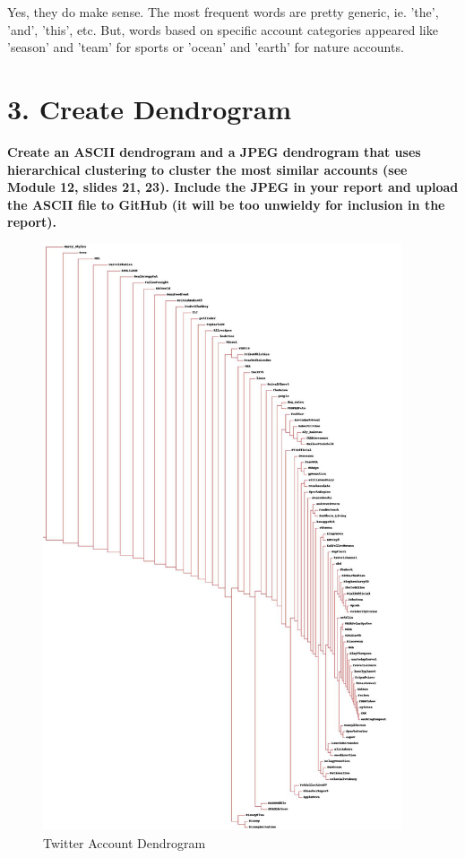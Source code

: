 \documentclass[12pt]{article}
\begin{document}
Yes, they do make sense. The most frequent words are pretty generic, ie. 'the', 'and', 'this', etc. But, words based on specific account categories appeared like 'season' and 'team' for sports or 'ocean' and 'earth' for nature accounts. 

\section*{3. Create Dendrogram}
\noindent \textbf{Create an ASCII dendrogram and a JPEG dendrogram that uses hierarchical clustering to cluster the most similar accounts (see Module 12, slides 21, 23). Include the JPEG in your report and upload the ASCII file to GitHub (it will be too unwieldy for inclusion in the report).}

\clearpage

\begin{figure}[h]
    \centering
    \includegraphics[width=300pt, scale=1]
    {accountclust.jpg}
    \caption{Twitter Account Dendrogram}
    \label{fig:dendrogram}
\end{figure}
\end{document}
